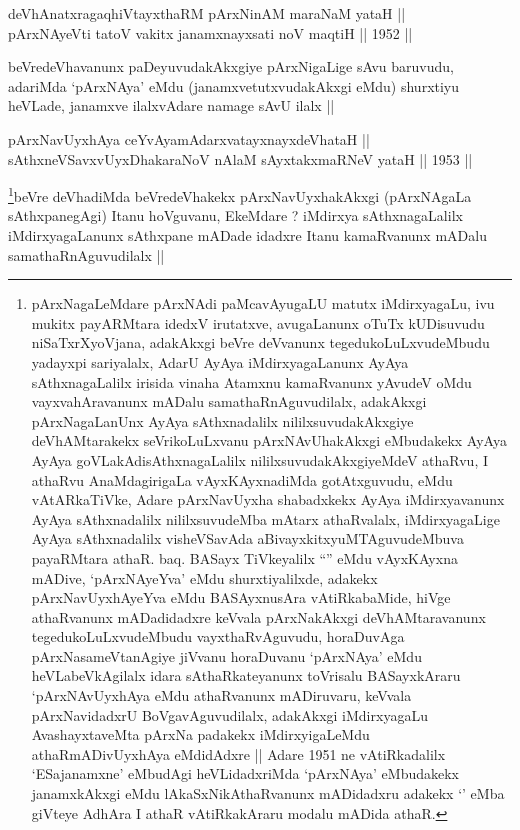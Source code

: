 \begin{shl}
deVhAnatxragaqhiVtayxthaRM pArxNinAM maraNaM yataH || \\
pArxNAyeVti tatoV vakitx janamxnayxsati noV maqtiH ||  1952 ||  
\end{shl}

\begin{artha}
beVredeVhavanunx paDeyuvudakAkxgiye pArxNigaLige sAvu baruvudu,
adariMda `pArxNAya' eMdu (janamxvetutxvudakAkxgi eMdu) shurxtiyu
heVLade, janamxve ilalxvAdare namage sAvU ilalx ||
\end{artha}


\begin{shl}
pArxNavUyxhAya ceYvAyamAdarxvatayxnayxdeVhataH || \\
sAthxneVSavxvUyxDhakaraNoV nAlaM sAyxtakxmaRNeV yataH ||  1953 ||  
\end{shl}

\begin{artha}
\footnote[1]{pArxNagaLeMdare pArxNAdi paMcavAyugaLU matutx
  iMdirxyagaLu, ivu mukitx payARMtara idedxV irutatxve, avugaLanunx
  oTuTx kUDisuvudu niSaTxrXyoVjana, adakAkxgi beVre deVvanunx
  tegedukoLuLxvudeMbudu yadayxpi sariyalalx, AdarU AyAya
  iMdirxyagaLanunx AyAya sAthxnagaLalilx irisida vinaha Atamxnu
  kamaRvanunx yAvudeV oMdu vayxvahAravanunx mADalu
  samathaRnAguvudilalx, adakAkxgi pArxNagaLanUnx AyAya sAthxnadalilx
  nililxsuvudakAkxgiye deVhAMtarakekx seVrikoLuLxvanu pArxNAvUhakAkxgi
  eMbudakekx AyAya AyAya goVLakAdisAthxnagaLalilx
  nililxsuvudakAkxgiyeMdeV athaRvu, I athaRvu AnaMdagirigaLa
  vAyxKAyxnadiMda gotAtxguvudu, \stext eMdu vAtARkaTiVke, Adare
  pArxNavUyxha shabadxkekx AyAya iMdirxyavanunx AyAya sAthxnadalilx
  nililxsuvudeMba mAtarx athaRvalalx, iMdirxyagaLige AyAya
  sAthxnadalilx visheVSavAda aBivayxkitxyuMTAguvudeMbuva payaRMtara
  athaR. baq. BASayx TiVkeyalilx ``\stext'' eMdu vAyxKAyxna mADive,
  `pArxNAyeYva' eMdu shurxtiyalilxde, adakekx pArxNavUyxhAyeYva eMdu
  BASAyxnusAra vAtiRkabaMide, hiVge athaRvanunx mADadidadxre keVvala
  pArxNakAkxgi deVhAMtaravanunx tegedukoLuLxvudeMbudu
  vayxthaRvAguvudu, horaDuvAga pArxNasameVtanAgiye jiVvanu horaDuvanu
  `pArxNAya' eMdu heVLabeVkAgilalx idara sAthaRkateyanunx toVrisalu
  BASayxkAraru `pArxNAvUyxhAya eMdu athaRvanunx mADiruvaru, keVvala
  pArxNavidadxrU BoVgavAguvudilalx, adakAkxgi iMdirxyagaLu
  AvashayxtaveMta pArxNa padakekx iMdirxyigaLeMdu athaRmADivUyxhAya
  eMdidAdxre || Adare 1951 ne vAtiRkadalilx `ESajanamxne' eMbudAgi
  heVLidadxriMda `pArxNAya' eMbudakekx janamxkAkxgi eMdu
  lAkaSxNikAthaRvanunx mADidadxru adakekx `\stext' eMba giVteye AdhAra
  I athaR vAtiRkakAraru modalu mADida athaR.}beVre deVhadiMda beVredeVhakekx pArxNavUyxhakAkxgi
(pArxNAgaLa sAthxpanegAgi) Itanu hoVguvanu, EkeMdare ? iMdirxya
sAthxnagaLalilx iMdirxyagaLanunx sAthxpane mADade idadxre Itanu
kamaRvanunx mADalu samathaRnAguvudilalx ||
\end{artha}

